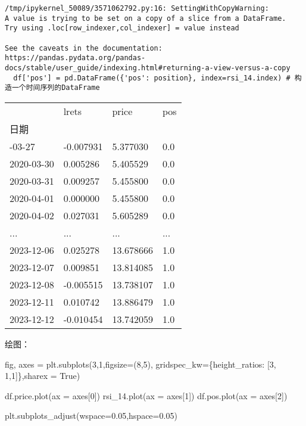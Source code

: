 \documentclass[
  letterpaper,
  DIV=11,
  numbers=noendperiod]{scrreprt}
\newenvironment{Shaded}{\begin{snugshade}}{\end{snugshade}}
\newcommand{\DecValTok}[1]{\textcolor[rgb]{0.68,0.00,0.00}{#1}}
\newcommand{\FloatTok}[1]{\textcolor[rgb]{0.68,0.00,0.00}{#1}}
\newcommand{\NormalTok}[1]{\textcolor[rgb]{0.00,0.23,0.31}{#1}}
\newcommand{\OperatorTok}[1]{\textcolor[rgb]{0.37,0.37,0.37}{#1}}
\newcommand{\StringTok}[1]{\textcolor[rgb]{0.13,0.47,0.30}{#1}}
\newcommand{\VariableTok}[1]{\textcolor[rgb]{0.07,0.07,0.07}{#1}}
\begin{document}
\begin{verbatim}
/tmp/ipykernel_50089/3571062792.py:16: SettingWithCopyWarning: 
A value is trying to be set on a copy of a slice from a DataFrame.
Try using .loc[row_indexer,col_indexer] = value instead

See the caveats in the documentation: https://pandas.pydata.org/pandas-docs/stable/user_guide/indexing.html#returning-a-view-versus-a-copy
  df['pos'] = pd.DataFrame({'pos': position}, index=rsi_14.index) # 构造一个时间序列的DataFrame
\end{verbatim}

\begin{longtable}[]{@{}llll@{}}
\toprule\noalign{}
& lrets & price & pos \\
日期 & & & \\
\midrule\noalign{}
\endhead
\bottomrule\noalign{}
\endlastfoot
2020-03-27 & -0.007931 & 5.377030 & 0.0 \\
2020-03-30 & 0.005286 & 5.405529 & 0.0 \\
2020-03-31 & 0.009257 & 5.455800 & 0.0 \\
2020-04-01 & 0.000000 & 5.455800 & 0.0 \\
2020-04-02 & 0.027031 & 5.605289 & 0.0 \\
... & ... & ... & ... \\
2023-12-06 & 0.025278 & 13.678666 & 1.0 \\
2023-12-07 & 0.009851 & 13.814085 & 1.0 \\
2023-12-08 & -0.005515 & 13.738107 & 1.0 \\
2023-12-11 & 0.010742 & 13.886479 & 1.0 \\
2023-12-12 & -0.010454 & 13.742059 & 1.0 \\
\end{longtable}

绘图：

\begin{Shaded}
\begin{Highlighting}[]
\NormalTok{fig, axes }\OperatorTok{=}\NormalTok{ plt.subplots(}\DecValTok{3}\NormalTok{,}\DecValTok{1}\NormalTok{,figsize}\OperatorTok{=}\NormalTok{(}\DecValTok{8}\NormalTok{,}\DecValTok{5}\NormalTok{), gridspec\_kw}\OperatorTok{=}\NormalTok{\{}\StringTok{\textquotesingle{}height\_ratios\textquotesingle{}}\NormalTok{: [}\DecValTok{3}\NormalTok{, }\DecValTok{1}\NormalTok{,}\DecValTok{1}\NormalTok{]\},sharex }\OperatorTok{=} \VariableTok{True}\NormalTok{)}

\NormalTok{df.price.plot(ax }\OperatorTok{=}\NormalTok{ axes[}\DecValTok{0}\NormalTok{])}
\NormalTok{rsi\_14.plot(ax }\OperatorTok{=}\NormalTok{ axes[}\DecValTok{1}\NormalTok{])}
\NormalTok{df.pos.plot(ax }\OperatorTok{=}\NormalTok{ axes[}\DecValTok{2}\NormalTok{])}

\NormalTok{plt.subplots\_adjust(wspace}\OperatorTok{=}\FloatTok{0.05}\NormalTok{,hspace}\OperatorTok{=}\FloatTok{0.05}\NormalTok{)}
\end{Highlighting}
\end{Shaded}
\end{document}
